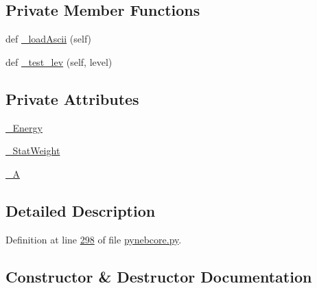 \subsection*{Private Member Functions}
\begin{DoxyCompactItemize}
\item 
def \hyperlink{classpyneb_1_1core_1_1pynebcore_1_1___atom_data_ascii_ac0d0c0c95f762944ec7e0ee660415416}{\+\_\+load\+Ascii} (self)
\item 
def \hyperlink{classpyneb_1_1core_1_1pynebcore_1_1___atom_data_ascii_a2b36467278900c759761366fe5b69c37}{\+\_\+test\+\_\+lev} (self, level)
\end{DoxyCompactItemize}
\subsection*{Private Attributes}
\begin{DoxyCompactItemize}
\item 
\hyperlink{classpyneb_1_1core_1_1pynebcore_1_1___atom_data_ascii_af9153c0218e68a785d82510cb2ee6248}{\+\_\+\+Energy}
\item 
\hyperlink{classpyneb_1_1core_1_1pynebcore_1_1___atom_data_ascii_ac3e956654089ac966a877dbaa003e3ea}{\+\_\+\+Stat\+Weight}
\item 
\hyperlink{classpyneb_1_1core_1_1pynebcore_1_1___atom_data_ascii_ae3bb56f0dd8397279d1e394768404903}{\+\_\+\+A}
\end{DoxyCompactItemize}


\subsection{Detailed Description}


Definition at line \hyperlink{pynebcore_8py_source_l00298}{298} of file \hyperlink{pynebcore_8py_source}{pynebcore.\+py}.



\subsection{Constructor \& Destructor Documentation}
\hypertarget{classpyneb_1_1core_1_1pynebcore_1_1___atom_data_ascii_a18839ec771a0105ab111f8c6411c70e1}{}
